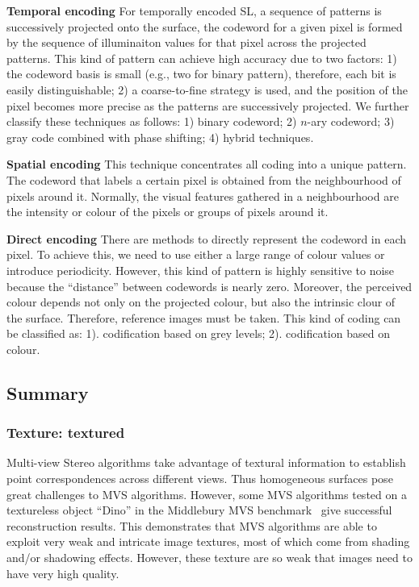 \textbf{Temporal encoding} For temporally encoded SL, a sequence of patterns is successively projected onto the surface, the codeword for a given pixel is formed by the sequence of illuminaiton values for that pixel across the projected patterns. This kind of pattern can achieve high accuracy due to two factors: 1) the codeword basis is small (e.g., two for binary pattern), therefore, each bit is easily distinguishable; 2) a coarse-to-fine strategy is used, and the position of the pixel becomes more precise as the patterns are successively projected. We further classify these techniques as follows: 1) binary codeword; 2) $n$-ary codeword; 3) gray code combined with phase shifting; 4) hybrid techniques.

\textbf{Spatial encoding} This technique concentrates all coding into a unique pattern. The codeword that labels a certain pixel is obtained from the neighbourhood of pixels around it. Normally, the visual features gathered in a neighbourhood are the intensity or colour of the pixels or groups of pixels around it.

\textbf{Direct encoding} There are methods to directly represent the codeword in each pixel. To achieve this, we need to use either a large range of colour values or introduce periodicity. However, this kind of pattern is highly sensitive to noise because the ``distance'' between codewords is nearly zero. Moreover, the perceived colour depends not only on the projected colour, but also the intrinsic clour of the surface. Therefore, reference images must be taken. This kind of coding can be classified as: 1). codification based on grey levels; 2). codification based on colour.

\subsection{Summary}

\subsubsection{Texture: textured}
Multi-view Stereo algorithms take advantage of textural information to establish point correspondences across different views. Thus homogeneous surfaces pose great challenges to MVS algorithms. However, some MVS algorithms tested on a textureless object ``Dino'' in the Middlebury MVS benchmark~\cite{seitz2006comparison} give successful reconstruction results. This demonstrates that MVS algorithms are able to exploit very weak and intricate image textures, most of which come from shading and/or shadowing effects. However, these texture are so weak that images need to have very high quality.

